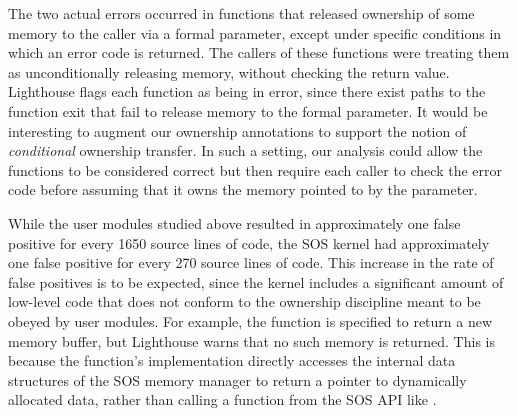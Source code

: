 The two actual errors occurred in functions that released ownership of
some memory to the caller via a formal parameter, except under specific
conditions in which an error code is returned.
%
The callers of these functions were treating them as unconditionally
releasing memory, without checking the return value.  
%
Lighthouse flags each function as being in error, since there exist
paths to the function exit that fail to release memory to the formal
parameter.  
%
It would be interesting to augment our ownership annotations to support
the notion of {\em conditional} ownership transfer.  
%
In such a setting, our analysis could allow the functions to be
considered correct but then require each caller to check the error code
before assuming that it owns the memory pointed to by the parameter.




While the user modules studied above resulted in approximately one false
positive for every 1650 source lines of code, the SOS kernel had
approximately one false positive for every 270 source lines of code.  
%
This increase in the rate of false positives is to be expected, since
the kernel includes a significant amount of low-level code that does not
conform to the ownership discipline meant to be obeyed by user modules.
%
For example, the function  is specified to
return a new memory buffer,  but Lighthouse warns that no such memory is
returned.  
%
This is because the function's implementation directly accesses the
internal data structures of the SOS memory manager to return a pointer
to dynamically allocated data, rather than calling a function from the
SOS API like .


